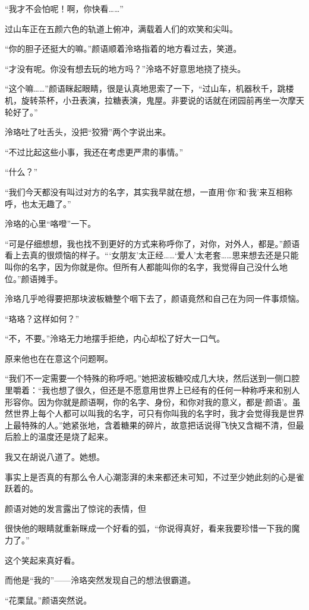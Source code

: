 \documentclass[UTF8, scheme = chinese, openany]{ctexbook}
\begin{document}
“我才不会怕呢！啊，你快看……”

过山车正在五颜六色的轨道上俯冲，满载着人们的欢笑和尖叫。

“你的胆子还挺大的嘛。”颜语顺着泠珞指着的地方看过去，笑道。

“才没有呢。你没有想去玩的地方吗？”泠珞不好意思地挠了挠头。

“这个嘛……”颜语眯起眼睛，很是认真地思索了一下，“过山车，机器秋千，跳楼机，旋转茶杯，小丑表演，拉糖表演，鬼屋。非要说的话就在闭园前再坐一次摩天轮好了。”

泠珞吐了吐舌头，没把“狡猾”两个字说出来。

“不过比起这些小事，我还在考虑更严肃的事情。”

“什么？”

“我们今天都没有叫过对方的名字，其实我早就在想，一直用‘你’和‘我’来互相称呼，也太无趣了。”

泠珞的心里“咯噔”一下。

“可是仔细想想，我也找不到更好的方式来称呼你了，对你，对外人，都是。”颜语看上去真的很烦恼的样子。“‘女朋友’太正经……‘爱人’太老套……思来想去还是只能叫你的名字，因为你就是你。但所有人都能叫你的名字，我觉得自己没什么地位。”颜语摊手。

泠珞几乎呛得要把那块波板糖整个咽下去了，颜语竟然和自己在为同一件事烦恼。

“珞珞？这样如何？”

“不，不要。”泠珞无力地摆手拒绝，内心却松了好大一口气。

原来他也在在意这个问题啊。

“我们不一定需要一个特殊的称呼吧。”她把波板糖咬成几大块，然后送到一侧口腔里嚼着：“我也想了很久，但还是不愿意用世界上已经有的任何一种称呼来和别人形容你。因为你就是颜语啊，你的名字、身份，和你对我的意义，都是‘颜语’。虽然世界上每个人都可以叫我的名字，可只有你叫我的名字时，我才会觉得我是世界上最特殊的人。”她紧张地，含着糖果的碎片，故意把话说得飞快又含糊不清，但最后脸上的温度还是烧了起来。

我又在胡说八道了。她想。

事实上是否真的有那么令人心潮澎湃的未来都还未可知，不过至少她此刻的心是雀跃着的。

颜语对她的发言露出了惊诧的表情，但

很快他的眼睛就重新眯成一个好看的弧，“你说得真好，看来我要珍惜一下我的魔力了。”

这个笑起来真好看。

而他是“我的”——泠珞突然发现自己的想法很霸道。

“花栗鼠。”颜语突然说。
\end{document}
